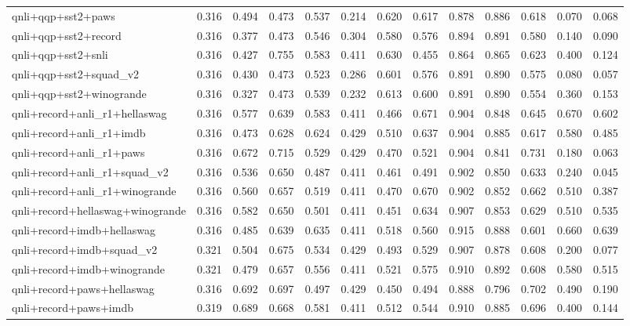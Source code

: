 \begin{table}[t]
\begin{tabular}{lrrrrrrrrrrrr}
    qnli+qqp+sst2+paws & 0.316 & 0.494 & 0.473 & 0.537 & 0.214 & 0.620 & 0.617 & 0.878 & 0.886 & 0.618 & 0.070 & 0.068 \\
    qnli+qqp+sst2+record & 0.316 & 0.377 & 0.473 & 0.546 & 0.304 & 0.580 & 0.576 & 0.894 & 0.891 & 0.580 & 0.140 & 0.090 \\
    qnli+qqp+sst2+snli & 0.316 & 0.427 & 0.755 & 0.583 & 0.411 & 0.630 & 0.455 & 0.864 & 0.865 & 0.623 & 0.400 & 0.124 \\
    qnli+qqp+sst2+squad\_v2 & 0.316 & 0.430 & 0.473 & 0.523 & 0.286 & 0.601 & 0.576 & 0.891 & 0.890 & 0.575 & 0.080 & 0.057 \\
    qnli+qqp+sst2+winogrande & 0.316 & 0.327 & 0.473 & 0.539 & 0.232 & 0.613 & 0.600 & 0.891 & 0.890 & 0.554 & 0.360 & 0.153 \\
    qnli+record+anli\_r1+hellaswag & 0.316 & 0.577 & 0.639 & 0.583 & 0.411 & 0.466 & 0.671 & 0.904 & 0.848 & 0.645 & 0.670 & 0.602 \\
    qnli+record+anli\_r1+imdb & 0.316 & 0.473 & 0.628 & 0.624 & 0.429 & 0.510 & 0.637 & 0.904 & 0.885 & 0.617 & 0.580 & 0.485 \\
    qnli+record+anli\_r1+paws & 0.316 & 0.672 & 0.715 & 0.529 & 0.429 & 0.470 & 0.521 & 0.904 & 0.841 & 0.731 & 0.180 & 0.063 \\
    qnli+record+anli\_r1+squad\_v2 & 0.316 & 0.536 & 0.650 & 0.487 & 0.411 & 0.461 & 0.491 & 0.902 & 0.850 & 0.633 & 0.240 & 0.045 \\
    qnli+record+anli\_r1+winogrande & 0.316 & 0.560 & 0.657 & 0.519 & 0.411 & 0.470 & 0.670 & 0.902 & 0.852 & 0.662 & 0.510 & 0.387 \\
    qnli+record+hellaswag+winogrande & 0.316 & 0.582 & 0.650 & 0.501 & 0.411 & 0.451 & 0.634 & 0.907 & 0.853 & 0.629 & 0.510 & 0.535 \\
    qnli+record+imdb+hellaswag & 0.316 & 0.485 & 0.639 & 0.635 & 0.411 & 0.518 & 0.560 & 0.915 & 0.888 & 0.601 & 0.660 & 0.639 \\
    qnli+record+imdb+squad\_v2 & 0.321 & 0.504 & 0.675 & 0.534 & 0.429 & 0.493 & 0.529 & 0.907 & 0.878 & 0.608 & 0.200 & 0.077 \\
    qnli+record+imdb+winogrande & 0.321 & 0.479 & 0.657 & 0.556 & 0.411 & 0.521 & 0.575 & 0.910 & 0.892 & 0.608 & 0.580 & 0.515 \\
    qnli+record+paws+hellaswag & 0.316 & 0.692 & 0.697 & 0.497 & 0.429 & 0.450 & 0.494 & 0.888 & 0.796 & 0.702 & 0.490 & 0.190 \\
    qnli+record+paws+imdb & 0.319 & 0.689 & 0.668 & 0.581 & 0.411 & 0.512 & 0.544 & 0.910 & 0.885 & 0.696 & 0.400 & 0.144 \\

\end{tabular}
\end{table}
